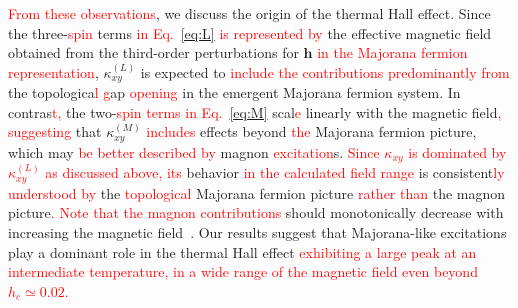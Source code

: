 \documentclass[twocolumn,superscriptaddress,showpacs, longbibliography, aps, prb]{revtex4-2}
\newcommand{\red}[1]{\textcolor{red}{#1}}
\newcommand{\blue}[1]{\textcolor{blue}{#1}}
\newcommand{\orange}[1]{\textcolor{orange}{#1}}
\begin{document}
\red{From these observations}, we discuss the origin of the thermal Hall effect.
Since the three-\red{spin} %
terms \red{in Eq.~\eqref{eq:L} is represented by} %
the effective magnetic field obtained from the third-order perturbations for $\bm{h}$ \red{in the Majorana fermion representation},
 $\kappa_{xy}^{(L)}$ is expected to %
\red{include the contributions predominantly from} the topologica\red{l %
g}ap \red{opening} in the emergent Majorana fermion system.
 In contras\red{t,} %
the two-\red{spin} %
\red{terms in Eq.~\eqref{eq:M}} 
scal\red{e} %
linearly with the magnetic field\red{, suggesting} %
that $\kappa_{xy}^{(M)}$ %
\red{includes} effects beyond %
\red{the} Majorana fermion picture, which
may %
\red{be better described by} magnon \red{excitation}s.
\red{Since $\kappa_{xy}$ is dominated by $\kappa_{xy}^{(L)}$ as discussed above, 
its} behavior \red{in the calculated field range} is consistent\red{ly understood by} %
the \red{topological} Majorana fermion picture %
\red{rather than} the magnon picture\red{. 
Note that the magnon contributions} %
should monotonically decrease %
with increasing the magnetic field~\cite{McClarty_PRB2018}.
Our results suggest that Majorana-like excitations %
play a dominant role in the thermal Hall effect %
\red{exhibiting a large peak at an intermediate temperature, in a wide range of the magnetic field even beyond $h_c \simeq 0.02$.} 
\end{document}
